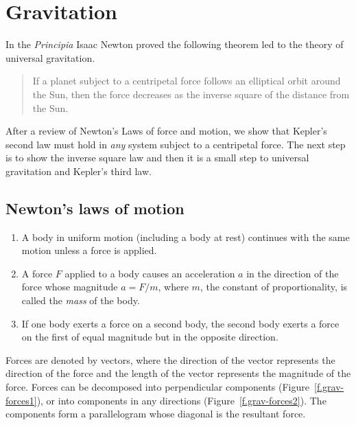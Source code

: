 

\chapter{Gravitation}\label{s.newton}

In the \textit{Principia} Isaac Newton proved the following theorem led to the theory of universal gravitation.
\begin{quote}
\begin{theorem}
If a planet subject to a centripetal force follows an elliptical orbit around the Sun, then the force decreases as the inverse square of the distance from the Sun.
\end{theorem}
\end{quote}
After a review of Newton's Laws of force and motion,  we show that Kepler's second law must hold in \emph{any} system subject to a centripetal force. The next step is to show the inverse square law and then it is a small step to universal gravitation and Kepler's third law.

\section{Newton's laws of motion}

\begin{enumerate}
\item A body in uniform motion (including a body at rest) continues with the same motion unless a force is applied.
\item A force $F$ applied to a body causes an acceleration $a$ in the direction of the force whose magnitude $a=F/m$, where $m$, the constant of proportionality, is called the \emph{mass} of the body.
\item If one body exerts a force on a second body, the second body exerts a force on the first of equal magnitude but in the opposite direction.
\end{enumerate}
Forces are denoted by vectors, where the direction of the vector represents the direction of the force and the length of the vector represents the magnitude of the force. Forces can be decomposed into perpendicular components (Figure~\ref{f.grav-forces1}), or into components in any directions (Figure~\ref{f.grav-forces2}). The components form a parallelogram whose diagonal is the resultant force.


